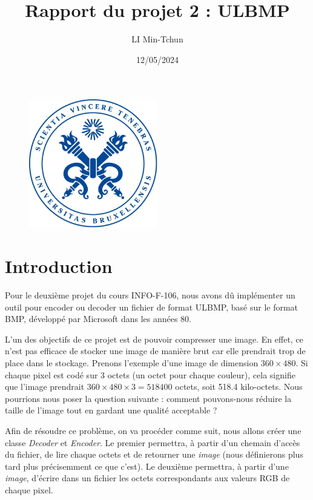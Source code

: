 \documentclass[utf8]{article}
\title{Rapport du projet 2 : ULBMP}
\author{LI Min-Tchun}
\date{12/05/2024}
\begin{document}
\maketitle
\begin{figure}[H]
\centering
\includegraphics[width=0.5\textwidth]{logo.png}
\label{fig:logo}
\end{figure}

\newpage
\tableofcontents
\newpage
\section{Introduction}
Pour le deuxième projet du cours INFO-F-106, nous avons dû implémenter un outil pour encoder ou decoder un fichier de format  ULBMP, basé sur le format BMP, développé par Microsoft dans les années 80.

L'un des objectifs de ce projet est de pouvoir compresser une image. En effet, ce n'est pas efficace de stocker une image de manière brut car elle prendrait trop de place dans le stockage. Prenons l'exemple d'une image de dimension $360 \times 480$. Si chaque pixel est codé sur 3 octets (un octet pour chaque couleur), cela signifie que l'image prendrait $360 \times 480 \times 3 = 518400$ octets, soit 518.4 kilo-octets. Nous pourrions nous poser la question suivante : comment pouvons-nous réduire la taille de l'image tout en gardant une qualité acceptable ?

Afin de résoudre ce problème, on va procéder comme suit, nous allons créer une classe \textit{Decoder} et \textit{Encoder}. Le premier permettra, à partir d'un chemain d'accès du fichier, de lire chaque octets et de retourner une \textit{image} (nous définierons plus tard plus précisemment ce que c'est). Le deuxième permettra, à partir d'une \textit{image}, d'écrire dans un fichier les octets correspondants aux valeurs RGB de chaque pixel.
\end{document}
